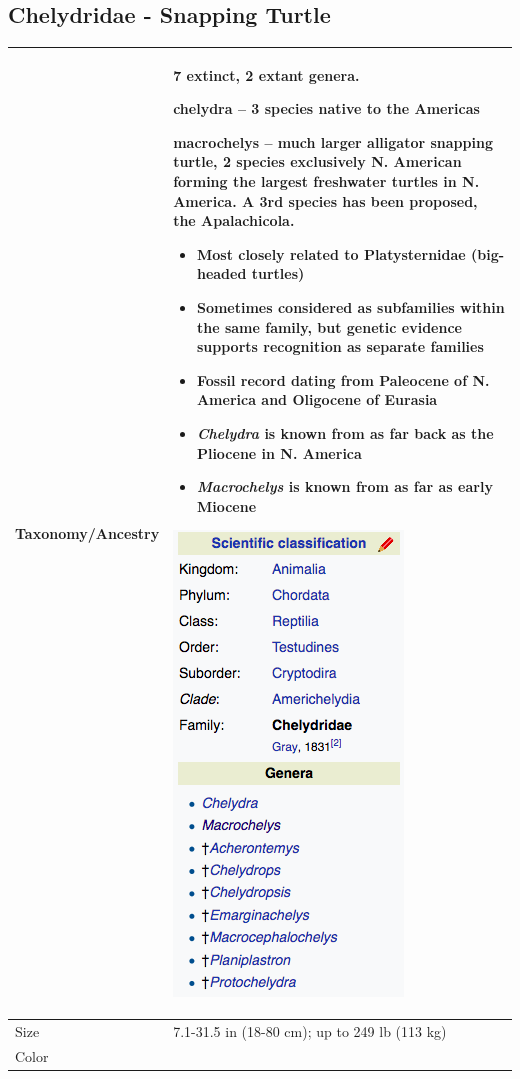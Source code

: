 
\subsection{Chelydridae - Snapping Turtle}
\begin{center}
\begin{longtabu} to 

	\hline
	Taxonomy/Ancestry &
	7 extinct, 2 extant genera.
	
	\textbf{chelydra} -- 3 species native to the Americas
	
	\textbf{macrochelys} -- much larger alligator snapping turtle, 2 species exclusively N. American forming the largest freshwater turtles in N. America. A 3rd species has been proposed, the Apalachicola.
	\begin{itemize}[noitemsep]
		\item Most closely related to Platysternidae (big-headed turtles)
		\item Sometimes considered as subfamilies within the same family, but genetic evidence supports recognition as separate families
		\item Fossil record dating from Paleocene of N. America and Oligocene of Eurasia
		\item \emph{Chelydra} is known from as far back as the Pliocene in N. America
		\item \emph{Macrochelys} is known from as far as early Miocene
	\end{itemize}
	
	\begin{center} \includegraphics[scale=0.5]{testudines/chelydridae/tax} \end{center}
	 \\
	\hline
	Size & 
	7.1-31.5 in (18-80 cm); up to 249 lb (113 kg)
	\\
	\hline
	Color &
	

\end{longtabu}
\end{center}
